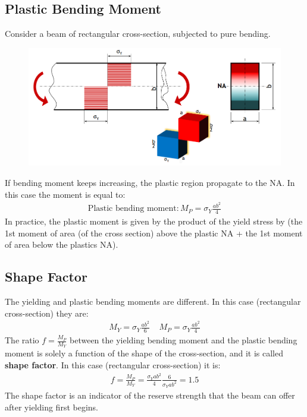 \documentclass[class=report, crop=false, 12pt,a4paper]{standalone}
\begin{document}
\subsection{Plastic Bending Moment}
Consider a beam of rectangular cross-section, subjected to pure bending.
\begin{figure}[H]
  \centering
  \includegraphics[width = 0.9 \textwidth]{../img/beam17.PNG}
\end{figure}
If bending moment keeps increasing, the plastic region propagate to the NA. In this case the moment is equal to:
\begin{gather}
  \text{Plastic bending moment}: M_P = \sigma_Y\frac{ab^2}{4}
\end{gather}
In practice, the plastic moment is given by the product of the yield stress by (the 1st moment of area (of the cross section) above the plastic NA + the 1st moment of area below the plastics NA).
\subsection{Shape Factor}
The yielding and plastic bending moments are different. In this case (rectangular cross-section) they are:
\begin{gather}
  M_Y = \sigma_Y\frac{ab^2}{6} \ \ \ \ \ M_P = \sigma_Y\frac{ab^2}{4}
\end{gather}
The ratio $f = \frac{M_P}{M_Y}$ between the yielding bending moment and the plastic bending moment is solely a function of the shape of the cross-section, and it is called \textbf{shape factor}. In this case (rectangular cross-section) it is:
\begin{gather}
  f = \frac{M_P}{M_Y} = \frac{\sigma_Y ab^2}{4}\frac{6}{\sigma_Y ab^2} = 1.5
\end{gather}
The shape factor is an indicator of the reserve strength that the beam can offer after yielding first begins.
\end{document}
